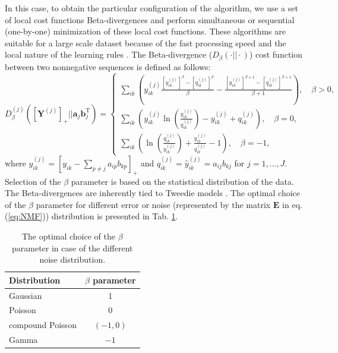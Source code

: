 \documentclass[3p,12pt]{elsarticle}
\begin{document}
In this case, to obtain the particular configuration of the algorithm, we use a set of local cost functions Beta-divergences and perform simultaneous or sequential (one-by-one) minimization of these local cost functions. These algorithms are suitable for a large scale dataset because of the fast processing speed and the local nature of the learning rules \cite{cichocki2008flexible,cichocki2009fast}.
The Beta-divergence ($D_\beta(\cdot||\cdot)$) cost function between two nonnegative sequences is defined as follows:
\begin{equation} 
\label{eq:beta_equations}
   D_\beta^{(j)}([\mathbf{Y}^{(j)}]_{+} ||\mathbf{a}_j\mathbf{b}_j^\textrm{T})=
\begin{cases}
\sum_{ik} \left(y_{ik}^{(j)} \frac{\left[y_{ik}^{(j)}\right]^\beta - \left[q_{ik}^{(j)}\right]^{\beta}}{\beta} - \frac{\left[y_{ik}^{(j)}\right]^{\beta+1} - \left[q_{ik}^{(j)}\right]^{\beta + 1}}{\beta+1}    \right), \quad \beta>0,\\
\sum_{ik} \left(y_{ik}^{(j)} \ln \left(  \frac{y_{ik}^{(j)}}{q_{ik}^{(j)}} \right) -y_{ik}^{(j)}+q_{ik}^{(j)}   \right), \quad \beta=0,\\
\sum_{ik} \left(  \ln \left(  \frac{q_{ik}^{(j)}}{y_{ik}^{(j)}}  \right)   + \frac{y_{ik}^{(j)}}{q_{ik}^{(j)}}  -1 \right),   \quad \beta=-1,
\end{cases}
\end{equation}
where $y_{ik}^{(j)} = \left[ y_{ik} - \sum_{p\neq j} a_{ip}b_{kp} \right]_{+}$ and $q_{ik}^{(j)} = \hat{y}_{ik}^{(j)} = a_{ij}b_{kj}$ for $j=1,\dots,J$. Selection of the $\beta$ parameter is based on the statistical distribution of the data. The Beta-divergences are inherently tied to Tweedie models \cite{Tweedie}. The optimal choice of the $\beta$ parameter for different error or noise (represented by the matrix $\mathbf{E}$ in eq. (\ref{eq:NMF})) distribution is presented in Tab. \ref{tab:beta_parameter}. 

\begin{table}[!ht]
    \centering
        \caption{The optimal choice of the $\beta$ parameter in case of the different noise distribution.}
    \begin{tabular}{l|c}
        Distribution & $\beta$ parameter \\ \hline
         Gaussian& 1 \\
         Poisson & $0$ \\ 
         compound Poisson & $(-1,0)$ \\
         Gamma & $-1$ \\
    \end{tabular}
    \label{tab:beta_parameter}
\end{table}
\end{document}
